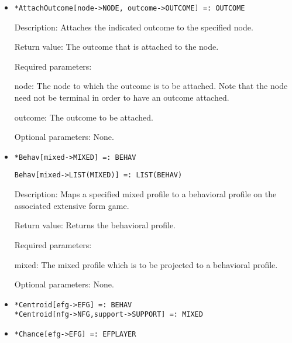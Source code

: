 \begin{itemize}
\item
\protect \large \begin{verbatim} 
*AttachOutcome[node->NODE, outcome->OUTCOME] =: OUTCOME
\end{verbatim}\normalsize

\bd
\item
[Description:] Attaches the indicated outcome to the specified node.
\item
[Return value:] The outcome that is attached to the node. 
\item
[Required parameters:]\hfil\null

\bd
\item
[node:] The node to which the outcome is to be attached.  Note that the
node need not be terminal in order to have an outcome attached.
\item
[outcome:] The outcome to be attached.  
\ed

\item
[Optional parameters:] None.
\ed


\item
\protect \large \begin{verbatim}
*Behav[mixed->MIXED] =: BEHAV
\end{verbatim}\normalsize
\protect \large \begin{verbatim}
Behav[mixed->LIST(MIXED)] =: LIST(BEHAV)
\end{verbatim}\normalsize

\bd
\item
[Description:] Maps a specified mixed profile to a behavioral
profile on the associated extensive form game.
\item
[Return value:] Returns the behavioral profile.
\item
[Required parameters:]\hfil\null

\bd
\item
[mixed:] The mixed profile which is to be projected to a behavioral
profile.
\ed

\item
[Optional parameters:] None.\hfill\null
\ed



\item
\protect \large \begin{verbatim} 
*Centroid[efg->EFG] =: BEHAV
*Centroid[nfg->NFG,support->SUPPORT] =: MIXED
\end{verbatim}\normalsize

\item
\protect \large \begin{verbatim}
*Chance[efg->EFG] =: EFPLAYER
\end{verbatim}\normalsize


\end{itemize}
